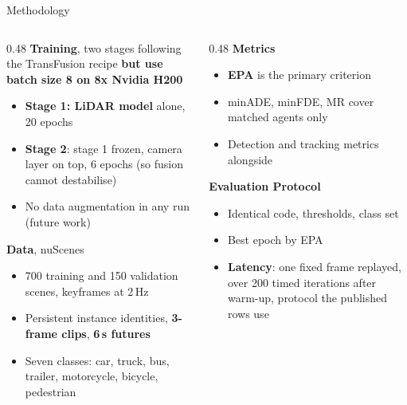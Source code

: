 \documentclass[aspectratio=169,11pt,t]{beamer}
\newcommand{\refcite}[1]{\textcolor{tuered}{\scriptsize\cite{#1}}}
\begin{document}
\begin{frame}{Methodology}
  \footnotesize
  \begin{columns}[T,onlytextwidth]
    \begin{column}{0.48\textwidth}
      \textbf{\color{tuered}Training}, two stages following the TransFusion
      recipe\refcite{Bai2022TransFusion} \textbf{but use batch size 8 on 8x Nvidia H200}
      \begin{itemize}\setlength{\itemsep}{1pt}
        \item \textbf{Stage 1: LiDAR model} alone, 20 epochs
        \item \textbf{Stage 2}: stage 1 frozen, camera layer on top, 6 epochs (so fusion cannot destabilise)
        \item \alert{No data augmentation in any run} (future work)
      \end{itemize}

      \vspace{-0.1em}
      \textbf{\color{tuered}Data}, nuScenes\refcite{Caesar2020nuScenes}
      \begin{itemize}\setlength{\itemsep}{1pt}
        \item 700 training and 150 validation scenes, keyframes at 2\,Hz
        \item Persistent instance identities, \textbf{3-frame clips}, \textbf{6\,s futures}
        \item Seven classes: car, truck, bus, trailer, motorcycle, bicycle,
          pedestrian
      \end{itemize}
    \end{column}
    \begin{column}{0.48\textwidth}
      \textbf{\color{tuered}Metrics}
      \begin{itemize}\setlength{\itemsep}{1pt}
        \item \textbf{EPA}\refcite{Gu2023ViP3D} is the primary criterion
          \hyperlink{epabackup}{}
        \item minADE, minFDE, MR cover \alert{matched} agents only
        \item Detection and tracking metrics alongside
      \end{itemize}

      \vspace{0.3em}
      \textbf{\color{tuered}Evaluation Protocol}
      \begin{itemize}\setlength{\itemsep}{1pt}
        \item Identical code, thresholds, class set
        \item Best epoch by EPA
        \item \textbf{Latency}: \alert{one fixed frame replayed}, 
          over 200 timed iterations after warm-up, protocol the
          published rows use
      \end{itemize}
    \end{column}
  \end{columns}
\end{frame}
\end{document}

